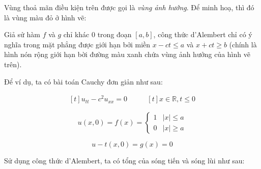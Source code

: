 \documentclass[a4paper]{article}
\begin{document}
Vùng thoả mãn điều kiện trên được gọi là \emph{vùng ảnh hưởng}. Để minh hoạ, thì đó là vùng màu đỏ ở hình vẽ:

\begin{center} 
\end{center}

Giả sử hàm $f$ và $g$ chỉ khác $0$ trong đoạn $[a, b]$, công thức d'Alembert chỉ có ý nghĩa trong mặt phẳng được giới hạn bởi miền $x - ct \leq a$ và $x + ct \geq b$ (chính là hình nón rộng giới hạn bời đường màu xanh chứa vùng ảnh hưởng của hình vẽ trên).

Để ví dụ, ta có bài toán Cauchy đơn giản như sau:

\begin{equation*}
\begin{aligned}[t]
u_{tt} - c^2u_{xx} = 0
\end{aligned}
\qquad
\begin{aligned}[t]
x \in \mathbb{R}, t \leq 0
\end{aligned}
\end{equation*}

\begin{equation*}
u(x, 0) = f(x) = 
\begin{cases}
1 & |x| \leq a \\
0 & |x| \geq a 
\end{cases}
\end{equation*}

\begin{equation*}
u-t(x, 0) = g(x) = 0
\end{equation*}

Sử dụng công thức d'Alembert, ta có tổng của sóng tiến và sóng lùi như sau:
\end{document}
